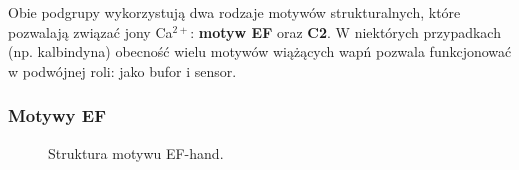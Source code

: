 Obie podgrupy wykorzystują dwa rodzaje motywów strukturalnych, które pozwalają związać jony Ca$^{2+}$: \textbf{motyw EF} oraz \textbf{C2}. W niektórych przypadkach (np. kalbindyna) obecność wielu motywów wiążących wapń pozwala funkcjonować w podwójnej roli: jako bufor i sensor. 

\subsubsection{Motywy EF}

\begin{figure}[tb]
\centering
\centering
\caption [Struktura motywu EF-hand]{Struktura motywu EF-hand.}
\label{fig:EFhand}
\end{figure}

